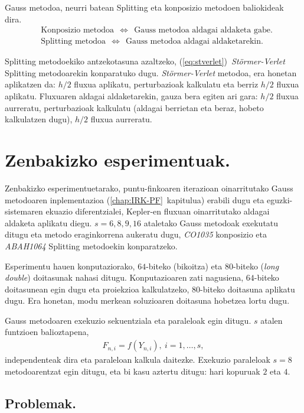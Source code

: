 Gauss metodoa, neurri batean  Splitting eta konposizio metodoen baliokideak dira. 
\begin{align*}
&\text{Konposizio metodoa} \ \ \Leftrightarrow \ \ \text{Gauss metodoa aldagai aldaketa gabe}.\\
&\text{Splitting metodoa}  \ \ \Leftrightarrow \ \  \text{Gauss metodoa aldagai aldaketarekin}.
\end{align*}

Splitting metodoekiko antzekotasuna azaltzeko, (\ref{eq:stverlet})~\emph{Störmer-Verlet} Splitting metodoarekin konparatuko dugu. \emph{Störmer-Verlet} metodoa, era honetan aplikatzen da: $h/2$ fluxua aplikatu, perturbazioak kalkulatu eta berriz  $h/2$ fluxua aplikatu. Fluxuaren aldagai aldaketarekin, gauza bera egiten ari gara: $h/2$ fluxua aurreratu, perturbazioak kalkulatu (aldagai berrietan eta beraz, hobeto kalkulatzen dugu), $h/2$ fluxua aurreratu. 


\section{Zenbakizko esperimentuak.}
\label{s:7espmt}

Zenbakizko esperimentuetarako, puntu-finkoaren iterazioan oinarritutako Gauss metodoaren inplementazioa (\ref{chap:IRK-PF}~kapitulua) erabili dugu eta eguzki-sistemaren ekuazio diferentzialei, Kepler-en fluxuan oinarritutako aldagai aldaketa aplikatu diegu. $s=6,8,9,16$ ataletako Gauss metodoak exekutatu ditugu eta metodo eraginkorrena aukeratu dugu, \emph{CO1035} konposizio eta \emph{ABAH1064} Splitting  metodoekin konparatzeko.

Esperimentu hauen konputaziorako, $64$-biteko (bikoitza) eta $80$-biteko (\emph{long double}) doitasunak nahasi ditugu. Konputazioaren zati nagusiena, $64$-biteko doitasunean egin dugu eta proiekzioa kalkulatzeko, $80$-biteko doitasuna aplikatu dugu. Era honetan, modu merkean soluzioaren doitasuna hobetzea lortu dugu.

Gauss metodoaren exekuzio sekuentziala eta paraleloak egin ditugu. $s$ atalen funtzioen balioztapena, 
\begin{align*}
F_{n,i}=f(Y_{n,i}), \ i=1,\dots,s,
\end{align*}      
independenteak dira eta paraleloan kalkula daitezke. Exekuzio paraleloak $s=8$ metodoarentzat egin ditugu, eta bi kasu aztertu ditugu: hari kopuruak $2$ eta $4$. 

\subsection{Problemak.}


